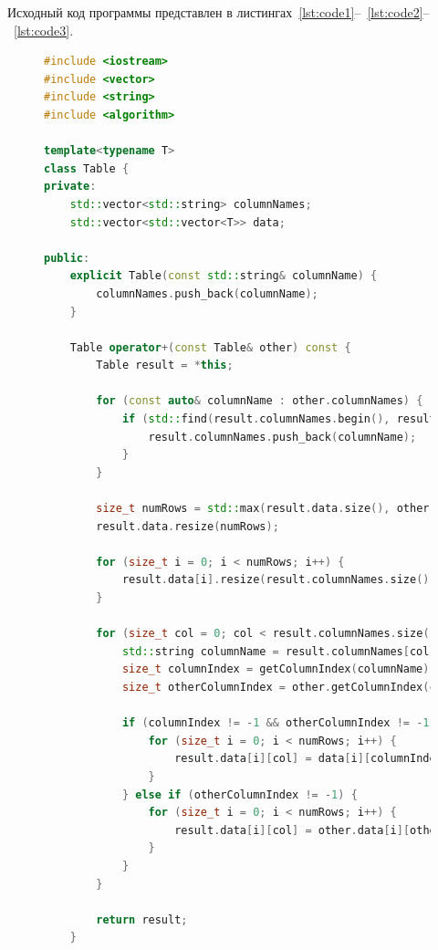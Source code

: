 \documentclass[a4paper, 14pt]{extarticle}
\begin{document}
Исходный код программы представлен в листингах~\ref{lst:code1}--~\ref{lst:code2}--~\ref{lst:code3}.

\begin{figure}[!htb]
\begin{lstlisting}[language={C++},caption={Class Table},label={lst:code1}]
#include <iostream>
#include <vector>
#include <string>
#include <algorithm>

template<typename T>
class Table {
private:
    std::vector<std::string> columnNames;
    std::vector<std::vector<T>> data;

public:
    explicit Table(const std::string& columnName) {
        columnNames.push_back(columnName);
    }

    Table operator+(const Table& other) const {
        Table result = *this;

        for (const auto& columnName : other.columnNames) {
            if (std::find(result.columnNames.begin(), result.columnNames.end(), columnName) == result.columnNames.end()) {
                result.columnNames.push_back(columnName);
            }
        }

        size_t numRows = std::max(result.data.size(), other.data.size());
        result.data.resize(numRows);

        for (size_t i = 0; i < numRows; i++) {
            result.data[i].resize(result.columnNames.size());
        }

        for (size_t col = 0; col < result.columnNames.size(); col++) {
            std::string columnName = result.columnNames[col];
            size_t columnIndex = getColumnIndex(columnName);
            size_t otherColumnIndex = other.getColumnIndex(columnName);

            if (columnIndex != -1 && otherColumnIndex != -1) {
                for (size_t i = 0; i < numRows; i++) {
                    result.data[i][col] = data[i][columnIndex] + other.data[i][otherColumnIndex];
                }
            } else if (otherColumnIndex != -1) {
                for (size_t i = 0; i < numRows; i++) {
                    result.data[i][col] = other.data[i][otherColumnIndex];
                }
            }
        }

        return result;
    }
\end{lstlisting}
\end{figure}
\newpage
\end{document}
